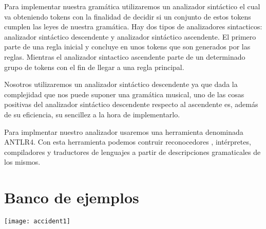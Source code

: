 \documentclass{article}
\begin{document}
Para implementar nuestra gramática utilizaremos un analizador sintáctico el cual va obteniendo tokens con la finalidad de
decidir si un conjunto de estos tokens cumplen las leyes de nuestra gramática. Hay dos tipos de analizadores sintacticos:
analizador sintáctico descendente y analizador sintáctico ascendente. El primero parte de una regla inicial y concluye en unos
tokens que son generados por las reglas. Mientras el analizador sintactico ascendente parte de un determinado grupo de tokens con
el fin de llegar a una regla principal.

Nosotros utilizaremos un analizador sintáctico descendente ya que dada la complejidad que nos puede suponer una gramática musical,
uno de las cosas positivas del analizador sintáctico descendente respecto al ascendente es, además de su eficiencia, su sencillez a
la hora de implementarlo.

Para implmentar nuestro analizador usaremos una herramienta denominada ANTLR4. Con esta herramienta podemos contruir reconocedores
, intérpretes, compiladores y traductores de lenguajes a partir de descripciones gramaticales de los mismos.

\section{Banco de ejemplos}
\texttt{[image: accident1]}
\end{document}
